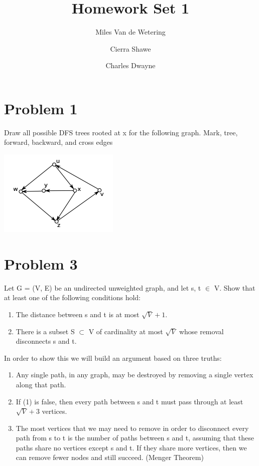 \documentclass[]{report}
\title{Homework Set 1}
\author{Miles Van de Wetering
	\and
	Cierra Shawe
	\and
	Charles Dwayne}
\begin{document}
\maketitle

\section*{Problem 1}
Draw all possible DFS trees rooted at x for the following graph. Mark, tree, forward,
backward, and cross edges
\begin{center}
	\includegraphics[]{hw1_p1_graph.png}
\end{center}

\section*{Problem 3}
Let G = (V, E) be an undirected unweighted graph, and let s, t $\in$ V. Show that at least one of the following conditions hold:
\begin{enumerate}
	\item The distance between s and t is at most $\sqrt{V} + 1$.
	\item There is a subset S $\subset$ V of cardinality at most $\sqrt{V}$ whose removal disconnects s and t.
\end{enumerate}

In order to show this we will build an argument based on three truths:
\begin{enumerate}
	\item Any single path, in any graph, may be destroyed by removing a single vertex along that path.
	\item If (1) is false, then every path  between s and t must pass through at least $\sqrt{V} + 3$ vertices.
	\item The most vertices that we may need to remove in order to disconnect every path from s to t is the number of paths between s and t, assuming that these paths share no vertices except s and t. If they share more vertices, then we can remove fewer nodes and still succeed. (Menger Theorem)
\end{enumerate}
	\smallskip
	
\end{document}
